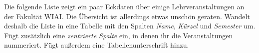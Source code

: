 Die folgende Liste zeigt ein paar Eckdaten über einige Lehrveranstaltungen an der Fakultät WIAI. Die Übersicht ist allerdings etwas unschön geraten. Wandelt deshalb die Liste in eine Tabelle mit den Spalten \emph{Name}, \emph{Kürzel} und \emph{Semester} um. Fügt zusätzlich eine \emph{zentrierte Spalte} ein, in denen ihr die Veranstaltungen nummeriert. Fügt außerdem eine Tabellenunterschrift hinzu.



